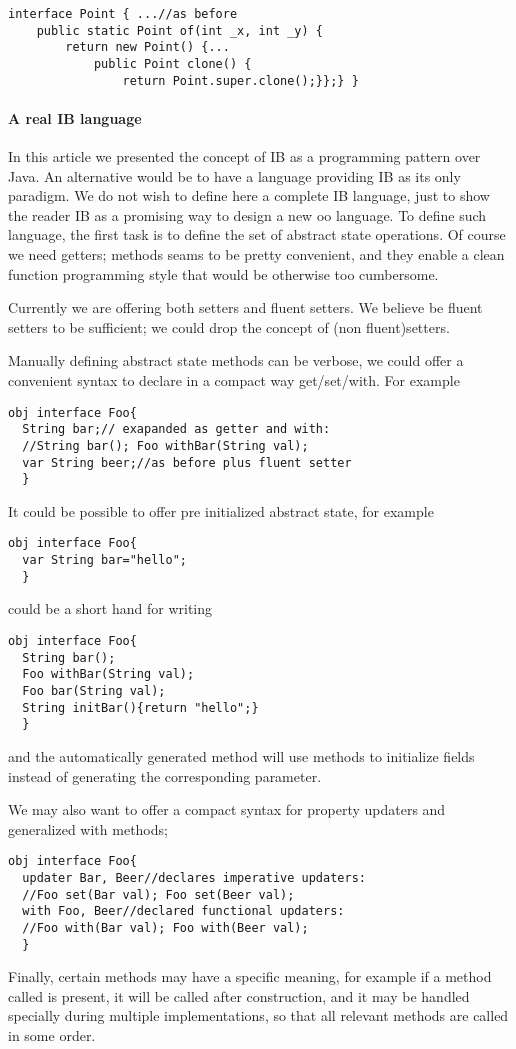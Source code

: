 \begin{lstlisting}
interface Point { ...//as before
    public static Point of(int _x, int _y) {
        return new Point() {...
            public Point clone() {
                return Point.super.clone();}};} }
\end{lstlisting}

\paragraph{A real IB language}
In this article we presented the concept of IB as a programming pattern over Java.
An alternative would be to have a language providing IB as its only paradigm.
We do not wish to define here a complete IB language, just to show the reader IB as
a promising way to design a new oo language.
To define such language, the first task is to define the set of abstract state operations.
Of course we need getters; \Q@withX@ methods seams to be pretty convenient, and they enable a
clean function programming style that would be otherwise too cumbersome.

Currently we are offering both setters and fluent setters.
We believe be fluent setters to be sufficient; we could drop the concept of (non fluent)setters.

Manually defining abstract state methods can be verbose, we could offer a convenient syntax to
declare in a compact way get/set/with.
For example
\begin{lstlisting}
obj interface Foo{
  String bar;// exapanded as getter and with:
  //String bar(); Foo withBar(String val);
  var String beer;//as before plus fluent setter
  }
\end{lstlisting}

It could be possible to offer pre initialized abstract state, for example
\begin{lstlisting}
obj interface Foo{
  var String bar="hello";
  }
\end{lstlisting}

could be a short hand for writing

\begin{lstlisting}
obj interface Foo{
  String bar();
  Foo withBar(String val);
  Foo bar(String val);
  String initBar(){return "hello";}
  }
\end{lstlisting}
and the automatically generated \Q@of@ method will use \Q@initX@ methods to initialize fields
instead of generating the corresponding parameter.


We may also want to offer a compact syntax for property updaters and generalized with methods;
\begin{lstlisting}
obj interface Foo{
  updater Bar, Beer//declares imperative updaters:
  //Foo set(Bar val); Foo set(Beer val);
  with Foo, Beer//declared functional updaters:
  //Foo with(Bar val); Foo with(Beer val);
  }
\end{lstlisting}
Finally, certain methods may have a specific meaning, for example
if a method called \Q@postInit@ is present, it will be called after construction,
and it may be handled specially during multiple implementations, so that all relevant \Q@postInit@ methods are
called in some order.

